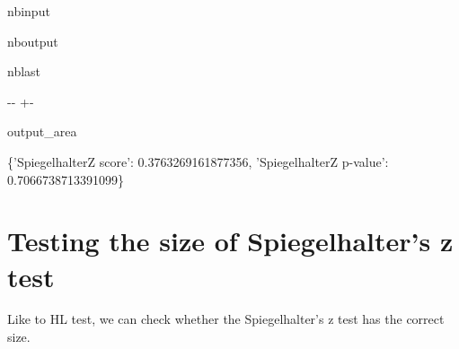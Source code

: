 \documentclass[letterpaper,10pt,english]{sphinxmanual}
\begin{document}
\begin{sphinxuseclass}{nbinput}
{
\begin{sphinxVerbatim}[commandchars=\\\{\}]
\llap{\color{nbsphinxin}[2]:\,\hspace{\fboxrule}\hspace{\fboxsep}}   
  
  \PYG{p}{[}\PYG{p}{]}
\end{sphinxVerbatim}
}

\end{sphinxuseclass}
\begin{sphinxuseclass}{nboutput}
\begin{sphinxuseclass}{nblast}
{

\kern-\sphinxverbatimsmallskipamount\kern-\baselineskip
\kern+\FrameHeightAdjust\kern-\fboxrule
\vspace{\nbsphinxcodecellspacing}

\begin{sphinxuseclass}{output_area}
\begin{sphinxuseclass}{}


\begin{sphinxVerbatim}[commandchars=\\\{\}]
\llap{\color{nbsphinxout}[2]:\,\hspace{\fboxrule}\hspace{\fboxsep}}\{'SpiegelhalterZ score': 0.3763269161877356,
 'SpiegelhalterZ p-value': 0.7066738713391099\}
\end{sphinxVerbatim}



\end{sphinxuseclass}
\end{sphinxuseclass}
}

\end{sphinxuseclass}
\end{sphinxuseclass}

\section{Testing the size of Spiegelhalter’s z test}
\label{\detokenize{notebooks/spiegelhalter_z:Testing-the-size-of-Spiegelhalter's-z-test}}
\sphinxAtStartPar
Like to HL test, we can check whether the Spiegelhalter’s z test has the correct size.
\end{document}
